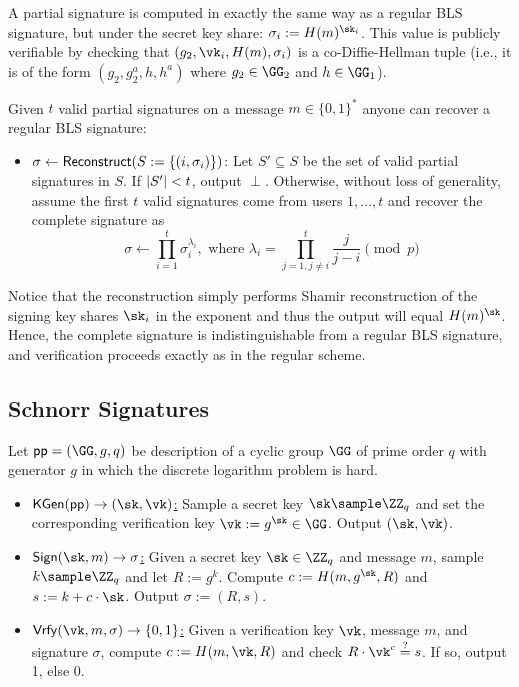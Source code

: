 A partial signature is computed in exactly the same way as a regular BLS signature, but under the secret key share: $\sigma_i := \blshash(m)^{\sk_i}$. This value is publicly verifiable by checking that $(g_2, \vk_i, \blshash(m), \sigma_i)$ is a co-Diffie-Hellman tuple (i.e., it is of the form $(g_2, g_2^a, h, h^a)$ where $g_2 \in \GG_2$ and $h \in \GG_1$).

 Given $t$ valid partial signatures on a message $m \in \{0,1\}^*$ anyone can recover a regular BLS signature:

\begin{itemize}
    \item \underline{$\sigma \gets \mathsf{Reconstruct}(S := \{(i, \sigma_i)\})$}: Let $S' \subseteq S$ be the set of valid partial signatures in $S$. If $\lvert S' \rvert < t$, output $\perp$. Otherwise, without loss of generality, assume the first $t$ valid signatures come from users $1, \dots, t$ and recover the complete signature as
    \[
        \sigma \gets \prod_{i=1}^t \sigma_i^{\lambda_i}, \text{ where } \lambda_i = \prod_{j=1,j\neq i}^t \frac{j}{j-i} \pmod{p}
    \]
\end{itemize}

Notice that the reconstruction simply performs Shamir reconstruction of the signing key shares $\sk_i$ in the exponent and thus the output will equal $\blshash(m)^{\sk}$. Hence, the complete signature is indistinguishable from a regular BLS signature, and verification proceeds exactly as in the regular scheme.

\subsection{Schnorr Signatures}\label{sec:schnorr}

\begin{construction}
    Let $\pparam = (\GG, g, q)$ be description of a cyclic group $\GG$ of prime order $q$ with generator $g$ in which the discrete logarithm problem is hard.
    \begin{itemize}
        \item \underline{$\kgen(\pparam) \to (\sk, \vk)$:} Sample a secret key $\sk \sample \ZZ_q$ and set the corresponding verification key $\vk := g^{\sk} \in \GG$. Output $(\sk, \vk)$.
        \item \underline{$\sign(\sk, m) \to \sigma$:} Given a secret key $\sk \in \ZZ_q$ and message $m$, sample $k \sample \ZZ_q$ and let $R := g^k$. Compute $c := H(m, g^\sk, R)$ and $s := k + c \cdot \sk$. Output $\sigma := (R, s)$.
        \item \underline{$\vrfy(\vk, m, \sigma) \to \{0,1\}$:} Given a verification key $\vk$, message $m$, and signature $\sigma$, compute $c := H(m, \vk, R)$ and check $R \cdot \vk^c \stackrel{?}{=} s$. If so, output 1, else 0.
    \end{itemize}
\end{construction}

